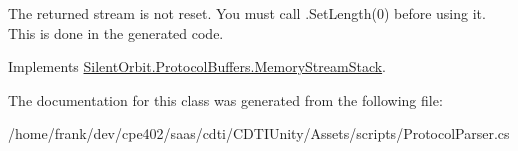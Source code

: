 The returned stream is not reset. You must call .Set\+Length(0) before using it. This is done in the generated code. 



Implements \hyperlink{interface_silent_orbit_1_1_protocol_buffers_1_1_memory_stream_stack}{Silent\+Orbit.\+Protocol\+Buffers.\+Memory\+Stream\+Stack}.



The documentation for this class was generated from the following file\+:\begin{DoxyCompactItemize}
\item 
/home/frank/dev/cpe402/saas/cdti/\+C\+D\+T\+I\+Unity/\+Assets/scripts/Protocol\+Parser.\+cs\end{DoxyCompactItemize}
